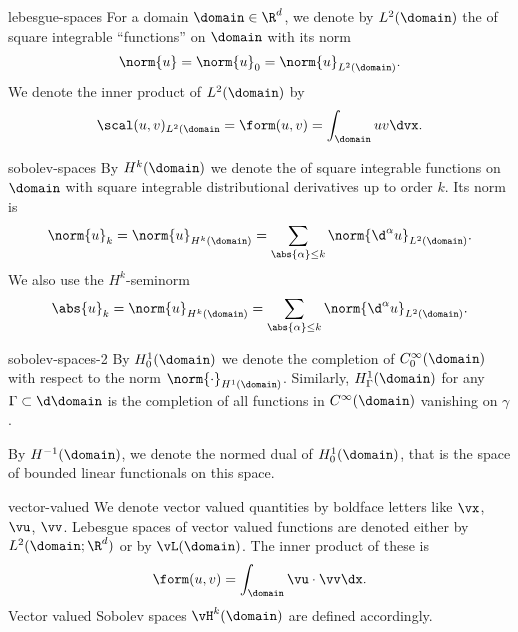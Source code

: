 \begin{Notation}{lebesgue-spaces}
  For a domain $\domain\in\R^d$, we denote by $L^2(\domain)$ the 
  of square integrable ``functions'' on $\domain$ with its norm
  \begin{gather}
    \norm{u} = \norm{u}_0 = \norm{u}_{L^2(\domain)}.
  \end{gather}
  We denote the inner product of $L^2(\domain)$ by
  \begin{gather}
    \scal(u,v)_{L^2(\domain} = \form(u,v) = \int_\domain u v \dvx.
  \end{gather}
\end{Notation}

\begin{Notation}{sobolev-spaces}
  By $H^k(\domain)$ we denote the
   of square integrable functions on $\domain$
  with square integrable distributional derivatives up to order
  $k$. Its norm is
  \begin{gather}
    \norm{u}_k = \norm{u}_{H^k(\domain)} = \sum_{\abs{\alpha} \le k}
    \norm{\d^\alpha u}_{L^2(\domain)}.
  \end{gather}
  We also use the $H^k$-seminorm
  \begin{gather}
    \abs{u}_k = \norm{u}_{H^k(\domain)} = \sum_{\abs{\alpha} \le k}
    \norm{\d^\alpha u}_{L^2(\domain)}.
  \end{gather}
\end{Notation}

\begin{Notation}{sobolev-spaces-2}
  By $H^1_0(\domain)$ we denote the
  completion of $C^\infty_0(\domain)$ with respect to the norm
  $\norm{\cdot}_{H^1(\domain)}$. Similarly,
  $H^1_{\Gamma}(\domain)$ for any
  $\Gamma\subset\d\domain$ is the completion of all functions in
  $C^\infty(\domain)$ vanishing on $\gamma$.

  By $H^{-1}(\domain)$, we denote the
  normed dual of $H^1_0(\domain)$, that is the space of bounded linear
  functionals on this space.
\end{Notation}

\begin{Notation}{vector-valued}
  We denote vector valued quantities by boldface letters like $\vx$,
  $\vu$, $\vv$. Lebesgue spaces of vector valued functions
  are denoted either by $L^2(\domain;\R^d)$ or by $\vL(\domain)$. The inner product of these is
  \begin{gather}
    \form(u,v) = \int_\domain \vu \cdot \vv \dx.
  \end{gather}
  Vector valued Sobolev spaces $\vH^k(\domain)$ are defined accordingly.
\end{Notation}

